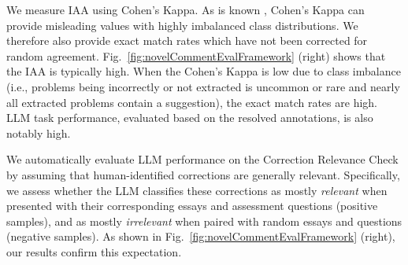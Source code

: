 

We measure IAA using Cohen's Kappa. As is known \cite{Feinstein1990}, Cohen's Kappa can provide misleading values with highly imbalanced class distributions. We therefore also provide exact match rates which have not been corrected for random agreement. Fig.~\ref{fig:novelCommentEvalFramework} (right) shows that the IAA is typically high. When the Cohen's Kappa is low due to class imbalance (i.e., problems being incorrectly or not extracted is uncommon or rare and nearly all extracted problems contain a suggestion), the exact match rates are high. LLM task performance, evaluated based on the resolved annotations, is also notably high.

We automatically evaluate LLM performance on the Correction Relevance Check by assuming that human-identified corrections are generally relevant. Specifically, we assess whether the LLM classifies these corrections as mostly \textit{relevant} when presented with their corresponding essays and assessment questions (positive samples), and as mostly \textit{irrelevant} when paired with random essays and questions (negative samples). As shown in Fig.~\ref{fig:novelCommentEvalFramework} (right), our results confirm this expectation.

